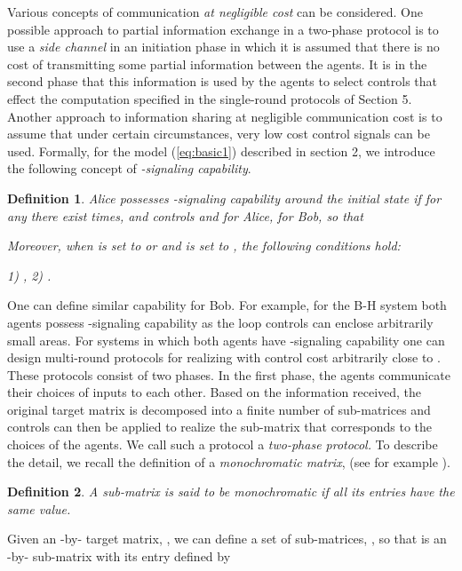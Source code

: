 \documentclass[12pt,onecolumn,draftcls]{IEEEtran}
\newtheorem{definition}{Definition}[section]
\begin{document}
Various concepts of communication {\em at negligible cost} can be considered.  One possible approach to partial information exchange in a two-phase protocol is to use a {\em side channel} in an initiation phase in which it is assumed that there is no cost of transmitting some partial information between the agents.  It is in the second phase that  this information is used by the agents to select controls that effect the computation specified in the single-round protocols of Section 5.  Another approach to information sharing at negligible communication cost is to assume that under certain circumstances, very low cost control signals can be used.  Formally, 
for the model (\ref{eq:basic1}) described in section 2, we introduce the following concept of
{\em -signaling capability}.

\begin{definition}
Alice possesses -signaling capability around the initial state  if for any  there exist times,  and controls
 and  for Alice,  for Bob, so that

Moreover, when  is set to  or  and  is set to , the following conditions hold:

\noindent
{\rm 1)} ,
{\rm 2)} .

\end{definition}
One can define similar capability for Bob.  For example, for the B-H system both agents
possess -signaling capability as the loop controls can enclose arbitrarily small areas.
For systems in which both agents have -signaling capability one can design
multi-round protocols for realizing  with control cost arbitrarily close to .
These protocols consist of two phases.
In the first phase, the agents communicate their choices of inputs to each other.
Based on the information received, the original target matrix is decomposed into a finite number
of sub-matrices and controls can then be applied to realize the sub-matrix that corresponds to the
choices of the agents.  We call such a protocol a {\em two-phase protocol.}
To describe the detail, we recall the definition of a {\em monochromatic matrix}, (see for example \cite{KN}).

\begin{definition}
A sub-matrix is said to be monochromatic if all its entries have the same value.
\end{definition}

Given an -by- target matrix, , we can define a set of sub-matrices, ,
so that  is an -by- sub-matrix with its  entry defined by
\end{document}
